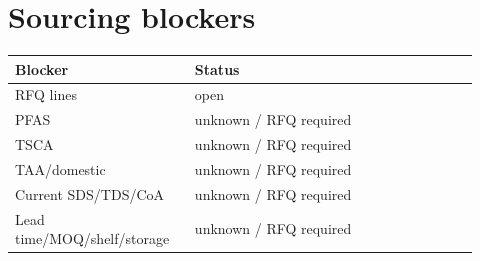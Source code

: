 \documentclass[10pt]{article}
\begin{document}
\section{Sourcing blockers}
{\footnotesize\begin{longtable}{@{}p{0.34\linewidth} p{0.58\linewidth}@{}}\toprule \textbf{Blocker} & \textbf{Status} \\ \midrule RFQ lines & open \\ PFAS & unknown / RFQ required \\ TSCA & unknown / RFQ required \\ TAA/domestic & unknown / RFQ required \\ Current SDS/TDS/CoA & unknown / RFQ required \\ Lead time/MOQ/shelf/storage & unknown / RFQ required \\ \bottomrule\end{longtable}}
\end{document}
